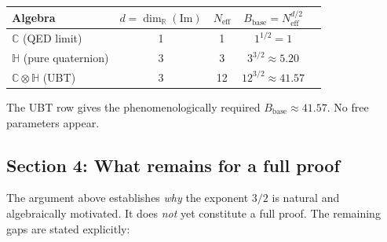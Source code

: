 \documentclass[11pt,a4paper]{article}
\theoremstyle{definition}
\theoremstyle{remark}
\begin{document}
\begin{center}
\begin{tabular}{lcccc}
  \hline
  Algebra & $d = \dim_\mathbb{R}(\mathrm{Im})$ & $N_{\mathrm{eff}}$ & $B_{\mathrm{base}} = N_{\mathrm{eff}}^{d/2}$ \\
  \hline
  $\mathbb{C}$ (QED limit) & 1 & 1  & $1^{1/2} = 1$        \\
  $\mathbb{H}$ (pure quaternion) & 3 & 3  & $3^{3/2} \approx 5.20$ \\
  $\mathbb{C}\otimes\mathbb{H}$ (UBT) & 3 & 12 & $12^{3/2} \approx 41.57$ \\
  \hline
\end{tabular}
\end{center}

The UBT row gives the phenomenologically required $B_{\mathrm{base}} \approx 41.57$.
No free parameters appear.

\subsection{Section 4: What remains for a full proof}
\label{sec:gap}

The argument above establishes \emph{why} the exponent $3/2$ is natural
and algebraically motivated.
It does \emph{not} yet constitute a full proof.
The remaining gaps are stated explicitly:
\end{document}
